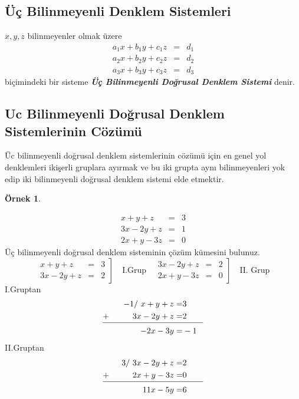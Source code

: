 \documentclass[a4paper,10pt]{book}
\theoremstyle{italik}
\newtheorem{ornek}{Örnek}[chapter]
\begin{document}
	
				    
	
		
\subsection{Üç Bilinmeyenli Denklem Sistemleri}
$x,y,z$ bilinmeyenler olmak üzere 
\begin{eqnarray*}
	a_1x+b_1y+c_1z & = & d_1 \\
	a_2x+b_2y+c_2z & = & d_2 \\
	a_3x+b_3y+c_3z & = & d_3
\end{eqnarray*}
biçimindeki bir sisteme \textsl{\textbf{Üç Bilinmeyenli Doğrusal Denklem Sistemi}} denir.
\subsection{Uc Bilinmeyenli Doğrusal Denklem Sistemlerinin Cözümü}
Üc bilinmeyenli doğrusal denklem sistemlerinin cözümü için en genel yol denklemleri ikişerli gruplara ayırmak ve bu iki grupta aynı bilinmeyenleri yok edip iki bilinmeyenli doğrusal denklem sistemi elde etmektir.
\begin{ornek}
\end{ornek}
\begin{eqnarray*}
	 x+y+z & = & 3 \\
	 3x-2y+z & = & 1 \\
	 2x+y-3z & = & 0
\end{eqnarray*}
Üç bilinmeyenli doğrusal denklem sisteminin çözüm kümesini bulunuz.
\begin{equation*}
	\left.
	\begin{aligned}
		x+y+z & = & 3 \\
		3x-2y+z & = & 2
	\end{aligned}
	\right] \quad \text{I.Grup} \quad
	\left.
	\begin{aligned}
		3x-2y+z & = & 2 \\
		2x+y-3z & = & 0
	\end{aligned}
	\right] \quad \text{II. Grup}
\end{equation*}
I.Gruptan
\begin{alignat}{4}
	-1/ \  x+y+z= & 3 \nonumber \\
	\underline{+ \hspace{10mm} \strut 3x-2y+z= } & \underline{\strut 2 \qquad}\nonumber \\
	-2x-3y= & -1 
\end{alignat}
II.Gruptan
\begin{alignat}{4}
	3/ \  3x-2y+z= & 2 \nonumber \\
	\underline{+ \hspace{10mm} \strut 2x+y-3z= } & \underline{\strut 0 \qquad}\nonumber \\
	11x-5y= & 6 
\end{alignat}
\end{document}
